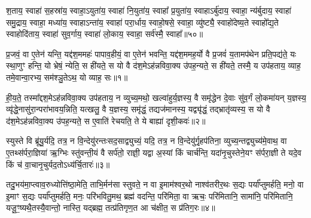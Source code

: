 {\anuvakamend[{प॒ञ्चा॒शते॒ द्वात्रिꣳ॑शत्॥19॥}]}

श॒ताय॒ स्वाहा॑ स॒हस्रा॑य॒ स्वाहा॒\-ऽयुता॑य॒ स्वाहा॑ नि॒युता॑य॒ स्वाहा᳚ प्र॒युता॑य॒ स्वाहा\-ऽर्बु॑दाय॒ स्वाहा॒ न्य॑र्बुदाय॒ स्वाहा॑ समु॒द्राय॒ स्वाहा॒ मध्या॑य॒ स्वाहा\-ऽन्ता॑य॒ स्वाहा॑ परा॒र्धाय॒ स्वाहो॒षसे॒ स्वाहा॒ व्यु॑ष्ट्यै॒ स्वाहो॑देष्य॒ते स्वाहो᳚द्य॒ते स्वाहोदि॑ताय॒ स्वाहा॑ सुव॒र्गाय॒ स्वाहा॑ लो॒काय॒ स्वाहा॒ सर्व॑स्मै॒ स्वाहा᳚॥५०॥

{\anuvakamend[{श॒ताया॒ष्टात्रिꣳ॑शत्॥20॥}]}


{}

\setcounter{anuvakam}{0}
प्र॒जवं॒ वा ए॒तेन॑ यन्ति॒ यद्द॑श॒ममहः॑ पापाव॒हीयं॒ वा ए॒तेन॑ भवन्ति॒ यद्द॑श॒ममह॒र्यो वै प्र॒जवं॑ य॒तामप॑थेन प्रति॒पद्य॑ते॒ यः स्था॒णुꣳ हन्ति॒ यो भ्रेषं॒ न्येति॒ स ही॑यते॒ स यो वै द॑श॒मे\-ऽह॑न्नविवा॒क्य उ॑पह॒न्यते॒ स ही॑यते॒ तस्मै॒ य उप॑हताय॒ व्याह॒ तमे॒वान्वा॒रभ्य॒ सम॑श्ञु॒ते\-ऽथ॒ यो व्याह॒ सः॥१॥

ही॒य॒ते॒ तस्मा᳚द्दश॒मे\-ऽह॑न्नविवा॒क्य उप॑हताय॒ न व्युच्य॒मथो॒ खल्वा॑हुर्य॒ज्ञस्य॒ वै समृ॑द्धेन दे॒वाः सु॑व॒र्गं लो॒कमा॑यन् य॒ज्ञस्य॒ व्यृ॑द्धे॒नासु॑रा॒न्परा॑भावय॒न्निति॒ यत्खलु॒ वै य॒ज्ञस्य॒ समृ॑द्धं॒ तद्यज॑मानस्य॒ यद्व्यृ॑द्धं॒ तद्भ्रातृ॑व्यस्य॒ स यो वै द॑श॒मे\-ऽह॑न्नविवा॒क्य उ॑पह॒न्यते॒ स ए॒वाति॑ रेचयति॒ ते ये बाह्या॑ दृशी॒कवः॑॥२॥

स्युस्ते वि ब्रू॑यु॒र्यदि॒ तत्र॒ न वि॒न्देयु॑रन्तःसद॒साद्व्युच्यं॒ यदि॒ तत्र॒ न वि॒न्देयु॑र्गृ॒हप॑तिना॒ व्युच्य॒न्तद्व्युच्य॑मे॒वाथ॒ वा ए॒तथ्स॑र्परा॒ज्ञिया॑ ऋ॒ग्भिः स्तु॑वन्ती॒यं वै सर्प॑तो॒ राज्ञी॒ यद्वा अ॒स्यां किं चार्च॑न्ति॒ यदा॑नृ॒चुस्तेने॒यꣳ स॑र्परा॒ज्ञी ते यदे॒व किं च॑ वा॒चानृ॒चुर्यद॒तो\-ऽध्य॑र्चि॒तारः॑॥३॥

तदु॒भय॑मा॒प्त्वाव॒रुध्योत्ति॑ष्ठा॒मेति॒ ताभि॒र्मन॑सा स्तुवते॒ न वा इ॒माम॑श्वर॒थो नाश्व॑तरीर॒थः स॒द्यः पर्या᳚प्तुमर्\mbox{}हति॒ मनो॒ वा इ॒माꣳ स॒द्यः पर्या᳚प्तुमर्\mbox{}हति॒ मनः॒ परि॑भवितु॒मथ॒ ब्रह्म॑ वदन्ति॒ परि॑मिता॒ वा ऋचः॒ परि॑मितानि॒ सामा॑नि॒ परि॑मितानि॒ यजू॒ꣳ॒ष्यथै॒तस्यै॒वान्तो॒ नास्ति॒ यद्ब्रह्म॒ तत्प्र॑तिगृण॒त आ च॑क्षीत॒ स प्र॑तिग॒रः॥४॥


